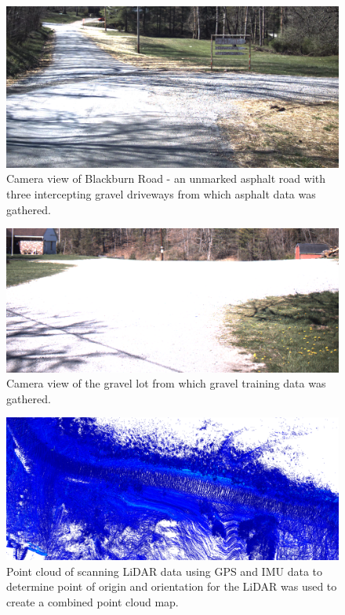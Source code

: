 \documentclass[journal,onecolumn]{IEEEtran}
\begin{document}
			\begin{figure}[H]
				\centering
				\includegraphics[width=0.75\linewidth]{figures/blackburn_road}
				\caption[Blackburn Road Camera View]{Camera view of Blackburn Road - an unmarked asphalt road with three intercepting gravel driveways from which asphalt data was gathered.}
				\label{fig:Blackburn_Road_View}
			\end{figure}
			
			\begin{figure}[H]
				\centering
				\includegraphics[width=0.75\linewidth]{figures/gravel_lot_pic}
				\caption[Gravel Training Lot]{Camera view of the gravel lot from which gravel training data was gathered.}
				\label{fig:gravel_training_lot}
			\end{figure}
		
			\begin{figure}[H]
				\centering
				\includegraphics[width=0.75\linewidth]{figures/pc_example}
				\caption[Aggregated Point Cloud Data]{Point cloud of scanning LiDAR data using GPS and IMU data to determine point of origin and orientation for the LiDAR was used to create a combined point cloud map.}
			\end{figure}
		
\end{document}
